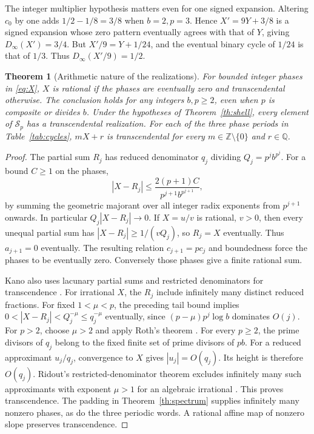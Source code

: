\documentclass[11pt]{article}
\newtheorem{theorem}{Theorem}
\newcommand{\Z}{\mathbb Z}
\newcommand{\Q}{\mathbb Q}
\begin{document}
The integer multiplier hypothesis matters even for one signed expansion. Altering \(c_0\) by one adds \(1/2-1/8=3/8\) when \(b=2,p=3\). Hence \(X'=9Y+3/8\) is a signed expansion whose zero pattern eventually agrees with that of \(Y\), giving \(D_\infty(X')=3/4\). But \(X'/9=Y+1/24\), and the eventual binary cycle of \(1/24\) is that of \(1/3\). Thus \(D_\infty(X'/9)=1/2\).

\begin{theorem}[Arithmetic nature of the realizations]\label{th:trans}
For bounded integer phases in \eqref{eq:X}, \(X\) is rational if the phases are eventually zero and transcendental otherwise. The conclusion holds for any integers \(b,p\ge2\), even when \(p\) is composite or divides \(b\). Under the hypotheses of Theorem~\ref{th:shell}, every element of \(\mathcal S_p\) has a transcendental realization. For each of the three phase periods in Table~\ref{tab:cycles}, \(mX+r\) is transcendental for every \(m\in\Z\setminus\{0\}\) and \(r\in\Q\).
\end{theorem}
\begin{proof}
The partial sum \(R_j\) has reduced denominator \(q_j\) dividing \(Q_j=p^j b^{p^j}\). For a bound \(C\ge1\) on the phases,
\[
 |X-R_j|\le\frac{2(p+1)C}{p^{j+1}b^{p^{j+1}}},
\]
by summing the geometric majorant over all integer radix exponents from \(p^{j+1}\) onwards. In particular \(Q_j|X-R_j|\to0\). If \(X=u/v\) is rational, \(v>0\), then every unequal partial sum has \(|X-R_j|\ge1/(vQ_j)\), so \(R_j=X\) eventually. Thus \(a_{j+1}=0\) eventually. The resulting relation \(c_{j+1}=pc_j\) and boundedness force the phases to be eventually zero. Conversely those phases give a finite rational sum.

Kano also uses lacunary partial sums and restricted denominators for transcendence \cite[Theorem~2]{kano}. For irrational \(X\), the \(R_j\) include infinitely many distinct reduced fractions. For fixed \(1<\mu<p\), the preceding tail bound implies \(0<|X-R_j|<Q_j^{-\mu}\le q_j^{-\mu}\) eventually, since \((p-\mu)p^j\log b\) dominates \(O(j)\). For \(p>2\), choose \(\mu>2\) and apply Roth's theorem \cite{roth}. For every \(p\ge2\), the prime divisors of \(q_j\) belong to the fixed finite set of prime divisors of \(pb\). For a reduced approximant \(u_j/q_j\), convergence to \(X\) gives \(|u_j|=O(q_j)\). Its height is therefore \(O(q_j)\). Ridout's restricted-denominator theorem excludes infinitely many such approximants with exponent \(\mu>1\) for an algebraic irrational \cite{ridout}. This proves transcendence. The padding in Theorem~\ref{th:spectrum} supplies infinitely many nonzero phases, as do the three periodic words. A rational affine map of nonzero slope preserves transcendence.
\end{proof}
\end{document}
